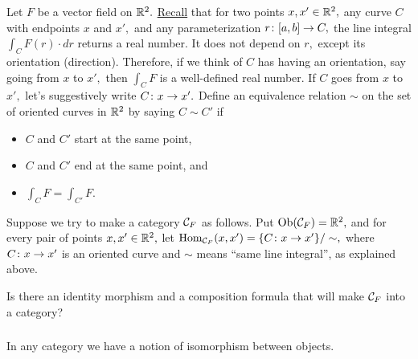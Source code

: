 \documentclass[../main/CT4S-EN-RU]{subfiles}
\begin{document}
\begin{remarkRUS}
\end{remarkRUS}

\begin{exerciseENG}\label{exc:vector field 1}
Let $F$ be a vector field on ${\mathbb R}^2.$ \href{http://en.wikipedia.org/wiki/Line_integral#Line_integral_of_a_vector_field}{Recall} that for two points $x,x'\in{\mathbb R}^2,$ any curve $C$ with endpoints $x$ and $x',$ and any parameterization $r\colon [a,b]\rightarrow C,$ the line integral $\int_CF(r)\cdot dr$ returns a real number. It does not depend on $r,$ except its orientation (direction). Therefore, if we think of $C$ has having an orientation, say going from $x$ to $x',$ then $\int_CF$ is a well-defined real number. If $C$ goes from $x$ to $x',$ let's suggestively write $C\colon x\rightarrow x'.$ Define an equivalence relation $\sim$ on the set of oriented curves in ${\mathbb R}^2$ by saying $C\sim C'$ if
\begin{itemize}
\item $C$ and $C'$ start at the same point,
\item $C$ and $C'$ end at the same point, and
\item $\int_CF=\int_{C'}F.$
\end{itemize}

Suppose we try to make a category $\mathcal{C}_F$ as follows. Put $\operatorname{Ob}(\mathcal{C}_F)={\mathbb R}^2,$ and for every pair of points $x,x'\in{\mathbb R}^2,$ let $\operatorname{Hom}_{\mathcal{C}_F}(x,x')=\{C\colon x\rightarrow x'\}/\sim,$ where $C\colon x\rightarrow x'$ is an oriented curve and $\sim$ means “same line integral”, as explained above. 

Is there an identity morphism and a composition formula that will make $\mathcal{C}_F$ into a category? 
\end{exerciseENG}

\begin{exerciseRUS}\label{exc:vector field 1}
\end{exerciseRUS}


\subsubsection{}

\begin{blockENG}
In any category we have a notion of isomorphism between objects.
\end{blockENG}
\end{document}
